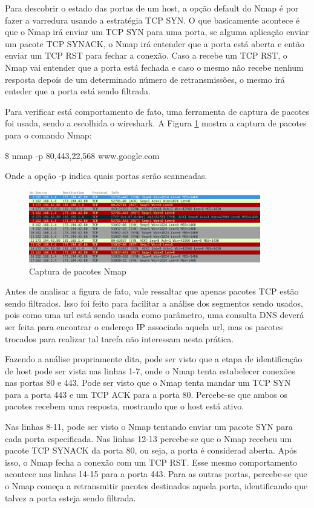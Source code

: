 Para descobrir o estado das portas de um host, a opção default do Nmap é por
fazer a varredura usando a estratégia TCP SYN. O que basicamente acontece é que
o Nmap irá enviar um TCP SYN para uma porta, se alguma aplicação enviar um
pacote TCP SYNACK, o Nmap irá entender que a porta está aberta e então enviar um 
TCP RST para fechar a conexão. Caso a recebe um TCP RST, o Nmap vai entender que
a porta está fechada e caso o mesmo não recebe nenhum resposta depois de um
determinado número de retransmissões, o mesmo irá enteder que a porta está sendo
filtrada.

Para verificar está comportamento de fato, uma ferramenta de captura de pacotes
foi usada, sendo a escolhida o wireshark. A Figura \ref{fig:captura_nmap} mostra
a captura de pacotes para o comando Nmap:

\$ nmap -p 80,443,22,568 www.google.com

Onde a opção -p indica quais portas serão scanneadas.

\begin{figure}[h]
  \centering
  \includegraphics[width=0.9\textwidth]{figuras/captura_nmap.eps}
  \caption{Captura de pacotes Nmap}
  \label{fig:captura_nmap}
\end{figure}

Antes de analisar a figura de fato, vale ressaltar que apenas pacotes TCP estão
sendo filtrados. Isso foi feito para facilitar a análise dos segmentos sendo
usados, pois como uma url está sendo usada como parâmetro, uma consulta DNS
deverá ser feita para encontrar o endereço IP associado aquela url, mas os
pacotes trocados para realizar tal tarefa não interessam nesta prática.

Fazendo a análise propriamente dita, pode ser visto que a etapa de identificação de host pode ser vista nas linhas 1-7,
onde o Nmap tenta estabelecer conexões nas portas 80 e 443. Pode ser visto que o Nmap tenta mandar um TCP SYN para a porta
443 e um TCP ACK para a porta 80. Percebe-se que ambos os pacotes recebem uma resposta, mostrando que o host está ativo.

Nas linhas 8-11, pode ser visto o Nmap tentando enviar um pacote SYN para cada porta especificada. Nas linhas 12-13 percebe-se
que o Nmap recebeu um pacote TCP SYNACK da porta 80, ou seja, a porta é considerad aberta. Após isso, o Nmap fecha a conexão com
um TCP RST. Esse mesmo comportamento acontece nas linhas 14-15 para a porta 443. Para as outras portas, percebe-se que o Nmap começa a
retransmitir pacotes destinados aquela porta, identificando que talvez a porta esteja sendo filtrada.

